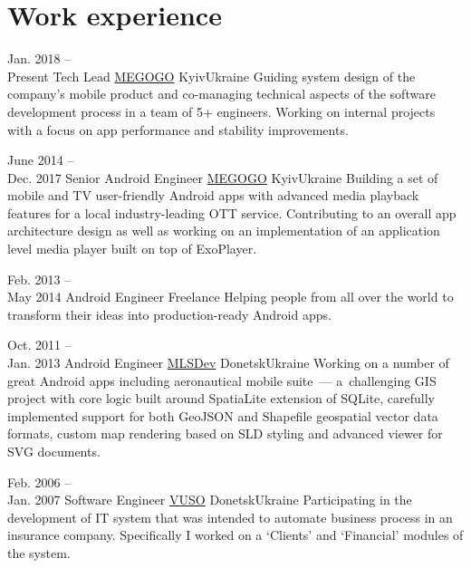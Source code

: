 \medskip
\section{Work experience}

\cventry
    {Jan. 2018 --\\Present}
    {Tech Lead}
    {\href{https://megogo.net/}{MEGOGO}}
    {Kyiv}{Ukraine}
    {Guiding system design of the company's mobile product and co-managing 
	technical aspects of the software development process in a team of 5+ 
	engineers. Working on internal projects with a focus on app performance 
	and stability improvements.\newline}

\cventry
    {June 2014 --\\Dec. 2017}
    {Senior Android Engineer}
    {\href{https://megogo.net/}{MEGOGO}}
    {Kyiv}{Ukraine}
    {Building a set of mobile and TV user-friendly Android apps with advanced 
	media playback features for a local industry-leading OTT service.
    Contributing to an overall app architecture design as well as working on 
	an implementation of an application level media player built on top of 
	ExoPlayer.\newline}

\cventry
    {Feb. 2013 --\\May 2014}
    {Android Engineer}
    {Freelance}
    {}{}
    {Helping people from all over the world to transform their ideas into 
    production-ready Android apps.\newline}

\cventry
    {Oct. 2011 --\\Jan. 2013}
    {Android Engineer}
    {\href{https://mlsdev.com/}{MLSDev}}
    {Donetsk}{Ukraine}
    {Working on a number of great Android apps including aeronautical mobile 
    suite~--- a~challenging GIS project with core logic built around SpatiaLite 
    extension of SQLite, carefully implemented support for both GeoJSON and 
    Shapefile geospatial vector data formats, custom map rendering based on SLD 
    styling and advanced viewer for SVG documents.\newline}

\cventry
    {Feb. 2006 --\\Jan. 2007}
    {Software Engineer}
    {\href{https://vuso.ua/}{VUSO}}
    {Donetsk}{Ukraine}
    {Participating in the development of IT system that was intended to 
    automate business process in an insurance company. Specifically I worked on 
    a `Clients' and `Financial' modules of the system.}


